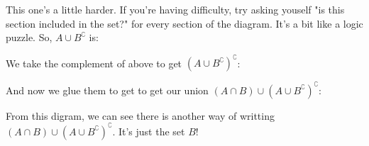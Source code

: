 \begin{venndiagram2sets}[shade=skyblue,labelNotAB={$\mathcal{U}$}]
	\fillACapB
\end{venndiagram2sets}

This one's a little harder. If you're having difficulty, try asking youself "is this section included in the set?" for every section of the diagram. It's a bit like a logic puzzle. So, $A \cup B^\complement$ is:

\begin{venndiagram2sets}[shade=skyblue,labelNotAB={$\mathcal{U}$}]
	\fillA \fillNotAorB
\end{venndiagram2sets}

We take the complement of above to get $(A \cup B^\complement)^\complement$:

\begin{venndiagram2sets}[shade=skyblue,labelNotAB={$\mathcal{U}$}]
	\fillOnlyB
\end{venndiagram2sets}

And now we glue them to get to get our union $(A \cap B) \cup (A \cup B^\complement)^\complement$:

\begin{venndiagram2sets}[shade=skyblue,labelNotAB={$\mathcal{U}$}]
	\fillB
\end{venndiagram2sets}

From this digram, we can see there is another way of writting $(A \cap B) \cup (A \cup B^\complement)^\complement$. It's just the set $B$!

